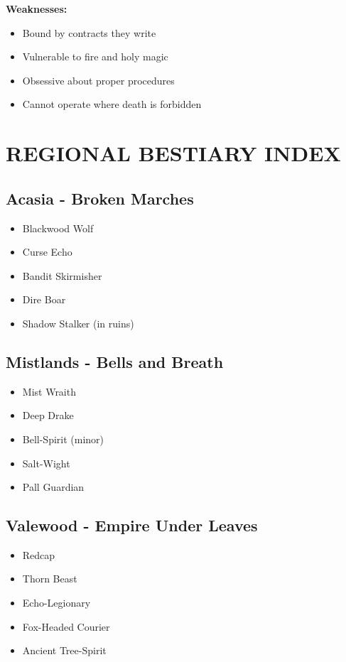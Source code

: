 \documentclass[12pt]{article}
\begin{document}
\begin{itemize}
\textbf{Weaknesses:}
\begin{itemize}
\item Bound by contracts they write
\item Vulnerable to fire and holy magic
\item Obsessive about proper procedures
\item Cannot operate where death is forbidden
\end{itemize}

\section{REGIONAL BESTIARY INDEX}

\subsection*{Acasia - Broken Marches}
\begin{itemize}
\item Blackwood Wolf
\item Curse Echo
\item Bandit Skirmisher
\item Dire Boar
\item Shadow Stalker (in ruins)
\end{itemize}

\subsection*{Mistlands - Bells and Breath}
\begin{itemize}
\item Mist Wraith
\item Deep Drake
\item Bell-Spirit (minor)
\item Salt-Wight
\item Pall Guardian
\end{itemize}

\subsection*{Valewood - Empire Under Leaves}
\begin{itemize}
\item Redcap
\item Thorn Beast
\item Echo-Legionary
\item Fox-Headed Courier
\item Ancient Tree-Spirit
\end{itemize}


\end{itemize}
\end{document}

